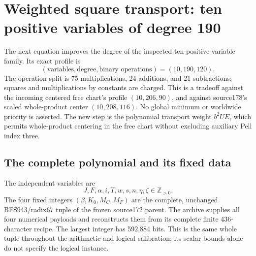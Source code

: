 \section{Weighted square transport: ten positive variables of degree 190}
\label{sec:weighted-positive}

The next equation improves the degree of the inspected ten-positive-variable
family. Its exact profile is
\[
 (\text{variables},\text{degree},\text{binary operations})=(10,190,120).
\]
The operation split is 75 multiplications, 24 additions, and 21 subtractions;
squares and multiplications by constants are charged. This is a tradeoff
against the incoming centered free chart's profile $(10,206,90)$, and against
source178's scaled whole-product center $(10,208,116)$. No global minimum or
worldwide priority is asserted. The new step is the polynomial transport
weight $b^2UE$, which permits whole-product centering in the free chart
without excluding auxiliary Pell index three.

\subsection{The complete polynomial and its fixed data}

The independent variables are
\[
 J,F,\alpha,i,T,w,s,n,\eta,\zeta\in\mathbb Z_{>0}.
\]
The four fixed integers $(\beta,K_0,M_C,M_F)$ are the complete, unchanged
BFS943/radix67 tuple of the frozen source172 parent. The archive supplies all
four numerical payloads and reconstructs them from its complete finite
436-character recipe. The largest integer has 592,884 bits. This is the same
whole tuple throughout the arithmetic and logical calibration; its scalar
bounds alone do not specify the logical instance.

